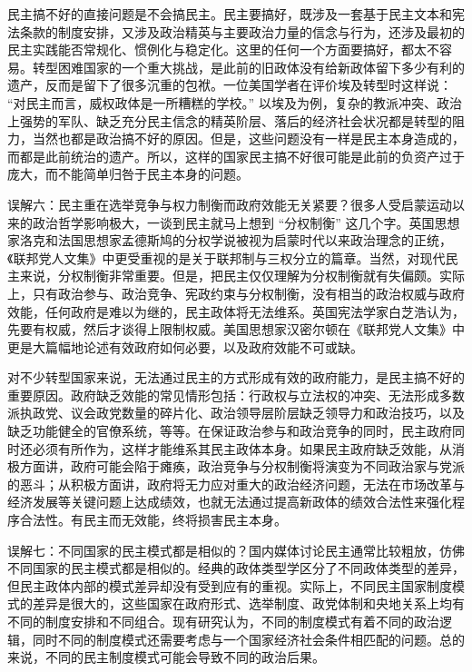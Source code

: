 民主搞不好的直接问题是不会搞民主。民主要搞好，既涉及一套基于民主文本和宪法条款的制度安排，又涉及政治精英与主要政治力量的信念与行为，还涉及最初的民主实践能否常规化、惯例化与稳定化。这里的任何一个方面要搞好，都太不容易。转型困难国家的一个重大挑战，是此前的旧政体没有给新政体留下多少有利的遗产，反而是留下了很多沉重的包袱。一位美国学者在评价埃及转型时这样说： “对民主而言，威权政体是一所糟糕的学校。” 以埃及为例，复杂的教派冲突、政治上强势的军队、缺乏充分民主信念的精英阶层、落后的经济社会状况都是转型的阻力，当然也都是政治搞不好的原因。但是，这些问题没有一样是民主本身造成的，而都是此前统治的遗产。所以，这样的国家民主搞不好很可能是此前的负资产过于庞大，而不能简单归咎于民主本身的问题。

误解六：民主重在选举竞争与权力制衡而政府效能无关紧要？很多人受启蒙运动以来的政治哲学影响极大，一谈到民主就马上想到 “分权制衡” 这几个字。英国思想家洛克和法国思想家孟德斯鸠的分权学说被视为启蒙时代以来政治理念的正统，《联邦党人文集》中更受重视的是关于联邦制与三权分立的篇章。当然，对现代民主来说，分权制衡非常重要。但是，把民主仅仅理解为分权制衡就有失偏颇。实际上，只有政治参与、政治竞争、宪政约束与分权制衡，没有相当的政治权威与政府效能，任何政府是难以为继的，民主政体将无法维系。英国宪法学家白芝浩认为，先要有权威，然后才谈得上限制权威。美国思想家汉密尔顿在《联邦党人文集》中更是大篇幅地论述有效政府如何必要，以及政府效能不可或缺。

对不少转型国家来说，无法通过民主的方式形成有效的政府能力，是民主搞不好的重要原因。政府缺乏效能的常见情形包括：行政权与立法权的冲突、无法形成多数派执政党、议会政党数量的碎片化、政治领导层阶层缺乏领导力和政治技巧，以及缺乏功能健全的官僚系统，等等。在保证政治参与和政治竞争的同时，民主政府同时还必须有所作为，这样才能维系其民主政体本身。如果民主政府缺乏效能，从消极方面讲，政府可能会陷于瘫痪，政治竞争与分权制衡将演变为不同政治家与党派的恶斗；从积极方面讲，政府将无力应对重大的政治经济问题，无法在市场改革与经济发展等关键问题上达成绩效，也就无法通过提高新政体的绩效合法性来强化程序合法性。有民主而无效能，终将损害民主本身。

误解七：不同国家的民主模式都是相似的？国内媒体讨论民主通常比较粗放，仿佛不同国家的民主模式都是相似的。经典的政体类型学区分了不同政体类型的差异，但民主政体内部的模式差异却没有受到应有的重视。实际上，不同民主国家制度模式的差异是很大的，这些国家在政府形式、选举制度、政党体制和央地关系上均有不同的制度安排和不同组合。现有研究认为，不同的制度模式有着不同的政治逻辑，同时不同的制度模式还需要考虑与一个国家经济社会条件相匹配的问题。总的来说，不同的民主制度模式可能会导致不同的政治后果。

